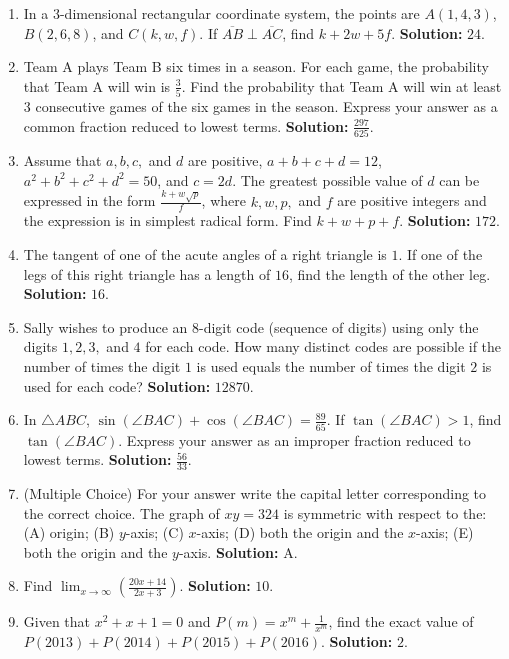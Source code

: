 \documentclass[10pt]{article}
\begin{document}
\begin{enumerate}
\item In a 3-dimensional rectangular coordinate system, the points are $A(1,4,3)$, $B(2,6,8)$, and $C(k,w,f)$. If $\overline{AB}\perp\overline{AC}$, find $k+2w+5f$. \textbf{Solution:} $24$.
\item Team A plays Team B six times in a season. For each game, the probability that Team A will win is $\frac35$. Find the probability that Team A will win at least 3 consecutive games of the six games in the season. Express your answer as a common fraction reduced to lowest terms. \textbf{Solution:} $\frac{297}{625}$.
\item Assume that $a,b,c,$ and $d$ are positive, $a+b+c+d=12$, $a^2+b^2+c^2+d^2=50$, and $c=2d$. The greatest possible value of $d$ can be expressed in the form $\frac{k+w\sqrt{p}}{f}$, where $k,w,p,$ and $f$ are positive integers and the expression is in simplest radical form. Find $k+w+p+f$. \textbf{Solution:} $172$.
\item The tangent of one of the acute angles of a right triangle is $1$. If one of the legs of this right triangle has a length of $16$, find the length of the other leg. \textbf{Solution:} $16$.
\item Sally wishes to produce an 8-digit code (sequence of digits) using only the digits $1,2,3,$ and $4$ for each code. How many distinct codes are possible if the number of times the digit $1$ is used equals the number of times the digit $2$ is used for each code? \textbf{Solution:} $12870$.
\item In $\triangle ABC$, $\sin(\angle BAC)+\cos(\angle BAC)=\frac{89}{65}$. If $\tan(\angle BAC)>1$, find $\tan(\angle BAC)$. Express your answer as an improper fraction reduced to lowest terms. \textbf{Solution:} $\frac{56}{33}$.
\item (Multiple Choice) For your answer write the capital letter corresponding to the correct choice. The graph of $xy=324$ is symmetric with respect to the: (A) origin; (B) $y$-axis; (C) $x$-axis; (D) both the origin and the $x$-axis; (E) both the origin and the $y$-axis. \textbf{Solution:} A.
\item Find $\displaystyle\lim_{x\to\infty}\left(\frac{20x+14}{2x+3}\right)$. \textbf{Solution:} $10$.
\item Given that $x^2+x+1=0$ and $P(m)=x^m+\frac{1}{x^m}$, find the exact value of $P(2013)+P(2014)+P(2015)+P(2016)$. \textbf{Solution:} $2$.
\end{enumerate}
\end{document}
